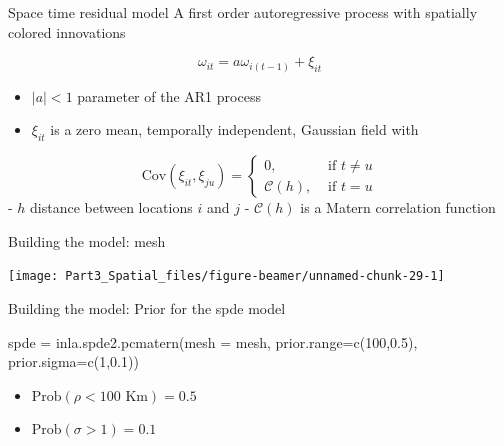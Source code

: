 \documentclass[
  ignorenonframetext,
]{beamer}
\newenvironment{Shaded}{\begin{snugshade}}{\end{snugshade}}
\newcommand{\AttributeTok}[1]{\textcolor[rgb]{0.77,0.63,0.00}{#1}}
\newcommand{\DecValTok}[1]{\textcolor[rgb]{0.00,0.00,0.81}{#1}}
\newcommand{\FloatTok}[1]{\textcolor[rgb]{0.00,0.00,0.81}{#1}}
\newcommand{\FunctionTok}[1]{\textcolor[rgb]{0.00,0.00,0.00}{#1}}
\newcommand{\NormalTok}[1]{#1}
\newcommand{\OtherTok}[1]{\textcolor[rgb]{0.56,0.35,0.01}{#1}}
\begin{document}
\begin{frame}{Space time residual model}
\protect\hypertarget{space-time-residual-model}{}
A first order autoregressive process with spatially colored innovations

\[
\omega_{it}  = a \omega_{i(t-1)}+\xi_{it}
\]

\begin{itemize}
\item
  \(|a|<1\) parameter of the AR1 process
\item
  \(\xi_{it}\) is a zero mean, temporally independent, Gaussian field
  with
\end{itemize}

\[
\text{Cov}(\xi_{it},\xi_{ju})  =
\begin{cases}
 0 ,& \text{ if } t\neq u \\
 \mathcal{C}(h),&  \text{ if } t= u
 \end{cases}
\] - \(h\) distance between locations \(i\) and \(j\) -
\(\mathcal{C}(h)\) is a Matern correlation function
\end{frame}

\begin{frame}{Building the model: mesh}
\protect\hypertarget{building-the-model-mesh}{}
\begin{center}\texttt{[image: Part3\_Spatial\_files/figure-beamer/unnamed-chunk-29-1]} \end{center}
\end{frame}

\begin{frame}[fragile]{Building the model: Prior for the spde model}
\protect\hypertarget{building-the-model-prior-for-the-spde-model}{}
\small

\begin{Shaded}
\begin{Highlighting}[]
\NormalTok{spde }\OtherTok{=} \FunctionTok{inla.spde2.pcmatern}\NormalTok{(}\AttributeTok{mesh =}\NormalTok{ mesh,}
                           \AttributeTok{prior.range=}\FunctionTok{c}\NormalTok{(}\DecValTok{100}\NormalTok{,}\FloatTok{0.5}\NormalTok{), }
                           \AttributeTok{prior.sigma=}\FunctionTok{c}\NormalTok{(}\DecValTok{1}\NormalTok{,}\FloatTok{0.1}\NormalTok{)) }
\end{Highlighting}
\end{Shaded}

\normalsize

\begin{itemize}
\item
  \(\text{Prob}(\rho<100\text{ Km}) = 0.5\)
\item
  \(\text{Prob}(\sigma>1) = 0.1\)
\end{itemize}
\end{frame}
\end{document}

